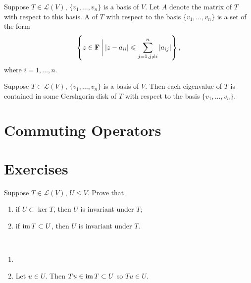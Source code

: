 \begin{definition}
Suppose $T\in\mathcal{L}(V)$, $\{v_1,\dots,v_n\}$ is a basis of $V$. Let $A$ denote the matrix of $T$ with respect to this basis. A  of $T$ with respect to the basis $\{v_1,\dots,v_n\}$ is a set of the form
\[\left\{z\in\mathbf F\:\bigg|\:|z-a_{ii}|\leqslant\sum_{j=1,j\neq i}^{n}|a_{ij}|\right\},\]
where $i=1,\dots,n$.
\end{definition}

\begin{theorem}
Suppose $T\in\mathcal{L}(V)$, $\{v_1,\dots,v_n\}$ is a basis of $V$. Then each eigenvalue of $T$ is contained in some Gershgorin disk of $T$ with respect to the basis $\{v_1,\dots,v_n\}$.
\end{theorem}
\pagebreak

\section{Commuting Operators}

\pagebreak

\section*{Exercises}
\begin{prbm}
Suppose $T\in\mathcal{L}(V)$, $U\le V$. Prove that
\begin{enumerate}[label=(\roman*)]
\item if $U\subset \ker T$, then $U$ is invariant under $T$;
\item if $\operatorname{im} T\subset U$, then $U$ is invariant under $T$.
\end{enumerate}
\end{prbm}

\begin{solution} \
\begin{enumerate}[label=(\roman*)]
\item 
\item Let $u\in U$. Then $Tu\in\operatorname{im} T\subset U$ so $Tu\in U$.
\end{enumerate}
\end{solution}